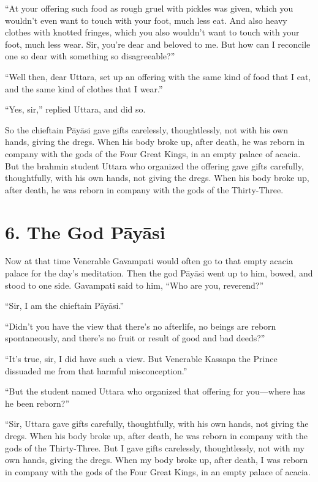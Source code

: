 \documentclass[12pt,openany]{book}%
\begin{document}
“At your offering such food as rough gruel with pickles was given, which you wouldn’t even want to touch with your foot, much less eat. And also heavy clothes with knotted fringes, which you also wouldn’t want to touch with your foot, much less wear. Sir, you’re dear and beloved to me. But how can I reconcile one so dear with something so disagreeable?” 

“Well then, dear Uttara, set up an offering with the same kind of food that I eat, and the same kind of clothes that I wear.” 

“Yes, sir,” replied Uttara, and did so. 

So the chieftain \textsanskrit{Pāyāsi} gave gifts carelessly, thoughtlessly, not with his own hands, giving the dregs. When his body broke up, after death, he was reborn in company with the gods of the Four Great Kings, in an empty palace of acacia. But the brahmin student Uttara who organized the offering gave gifts carefully, thoughtfully, with his own hands, not giving the dregs. When his body broke up, after death, he was reborn in company with the gods of the Thirty-Three. 

\section*{6. The God \textsanskrit{Pāyāsi} }

Now at that time Venerable Gavampati would often go to that empty acacia palace for the day’s meditation. Then the god \textsanskrit{Pāyāsi} went up to him, bowed, and stood to one side. Gavampati said to him, “Who are you, reverend?” 

“Sir, I am the chieftain \textsanskrit{Pāyāsi}.” 

“Didn’t you have the view that there’s no afterlife, no beings are reborn spontaneously, and there’s no fruit or result of good and bad deeds?” 

“It’s true, sir, I did have such a view. But Venerable Kassapa the Prince dissuaded me from that harmful misconception.” 

“But the student named Uttara who organized that offering for you—where has he been reborn?” 

“Sir, Uttara gave gifts carefully, thoughtfully, with his own hands, not giving the dregs. When his body broke up, after death, he was reborn in company with the gods of the Thirty-Three. But I gave gifts carelessly, thoughtlessly, not with my own hands, giving the dregs. When my body broke up, after death, I was reborn in company with the gods of the Four Great Kings, in an empty palace of acacia. 
\end{document}
